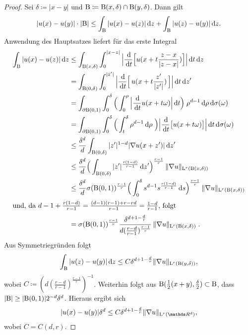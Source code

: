 \begin{proof}
  Sei $\delta \coloneqq | x - y|$ und $\mathrm{B} \coloneqq \mathrm{B}(x,\delta) \cap \mathrm{B}(y,\delta)$.
  Dann gilt
  $$
  |u(x) - u(y)| \cdot |\mathrm{B}|
  \leq \int_{\mathrm{B}} |u(x) - u(z)| \, {\operatorname{d}\!{z}} + \int_{\mathrm{B}} |u(z) - u(y)| \, {\operatorname{d}\!{z}}.
  $$
  Anwendung des Hauptsatzes liefert für das erste Integral
  \begin{align*}
    \int_\BB |u(x) - u(z)| \d z 
    &\leq \int_{\BB(x,\delta)} \int_0^{|x - z|} \Big| \frac{\d{}}{\d t} \Big[u(x + t \frac{z - x}{|z - x|})\Big] \Big| \d t \d z \\
    &= \int_{\BB(0,\delta)} \int_0^{|z'|} \Big| \frac{\d{}}{\d t} \Big[\, u(x + t \frac{z'}{|z'|} ) \, \Big] \Big| \d t \d z' \\
    &= \int_{\partial\BB(0,1)} \int_0^\delta \Big( \int_0^\rho \Big| \frac{\d{}}{\d t} u(x + t \omega) \Big| \d t \Big) \; \rho^{d - 1} \d \rho \d \sigma(\omega)  \\
    &= \int_{\partial\BB(0,1)} \int_0^\delta \Big( \int_t^\delta \rho^{d - 1} \d \rho \; \Big) \Big| \frac{\d{}}{\d t} \big[ u(x + t \omega) \big] \Big| \d t \d \sigma(\omega) \\
    &\leq \frac{\delta^d}{d} \int_{\BB(0,\delta)} |z'|^{1 - d} |\nabla u(x + z')| \d z' \\
    &\leq \frac{\delta^d}{d} \Big( \int_{\BB(0,\delta)} |z'|^{\frac{r(1 - d)}{r - 1}} \d z' \Big)^{\frac{r - 1}{r}} \, \|\nabla u\|_{\Ell^r(\BB(x,\delta))} \\
    &\leq\frac{\delta^d}{d}\sigma(\BB(0,1))^{\frac{r - 1}{r}}  \Big( \int_0^\delta s^{d - 1} s^{\frac{r(1 - d)}{r - 1}} \d s \Big)^{\frac{r - 1}{r}} \, \|\nabla u\|_{\Ell^r(\BB(x,\delta))} \\
    \intertext{und, da $d - 1 + \frac{r(1 - d)}{r - 1} = \frac{(d - 1)(r - 1) + r - rd}{r - 1} = \frac{1 - d}{r - 1}$, folgt}
    &= \sigma(\BB(0,1))^{\frac{r - 1}{r}} \frac{\delta^{d + 1 - \frac{d}{r}}}{d(\frac{r - d}{r - 1})^{\frac{r - 1}{r}}} \, \| \nabla u\|_{\Ell^r(\BB(x,\delta))}\;.
  \end{align*}
  Aus Symmetriegründen folgt
  $$
  \int_{\mathrm{B}} |u(z) - u(y)| \, {\operatorname{d}\!{z}}
  \leq C \delta^{d + 1 - \frac{d}{r}} \|\nabla u\|_{\mathrm{L}^r(\mathrm{B}(y,\delta))},
  $$
  wobei $ C \coloneqq (d(\frac{r - d}{r - 1})^{\frac{r - 1}{r}})^{-1} $.
  Weiterhin folgt aus $\mathrm{B}(\frac{1}{2}(x + y), \frac{\delta}{2}) \subset \mathrm{B}$, dass $|\mathrm{B}| \geq |\mathrm{B}(0,1)| 2^{-d} \delta^d$.
  Hieraus ergibt sich 
  $$
  |u(x) - u(y)| \delta^d \leq C \delta^{d + 1 - \frac{d}{r}} \| \nabla u\|_{\Ell^r(\R^d)},
  $$
  wobei $C = C(d,r)$.
\end{proof}

